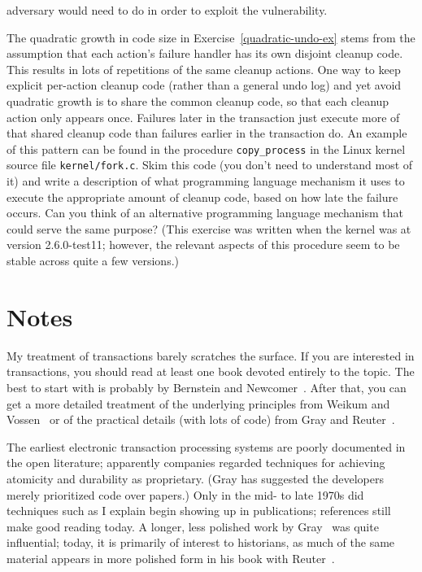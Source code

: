 \begin{chapterEnumerate}
adversary would need to do in order to exploit the vulnerability.
\item
\label{kernel-failure-atomicity-exercise}
The quadratic growth in code size in Exercise~\ref{quadratic-undo-ex} stems
from the assumption that each action's failure handler has its own disjoint
cleanup code.  This results in lots of repetitions of the same cleanup
actions.  One way to keep explicit per-action cleanup code (rather than a
general undo log) and yet avoid quadratic growth is to share the common
cleanup code, so that each cleanup action only appears once.  Failures later
in the transaction just execute more of that shared cleanup code than
failures earlier in the transaction do. An example of this pattern can
be found in the procedure \verb|copy_process| in the Linux kernel
source file \verb|kernel/fork.c|.  Skim this code (you don't need to
understand most of it) and write a description of what
programming language mechanism it uses to execute the appropriate
amount of cleanup code, based on how late the failure occurs.  Can you
think of an alternative programming language mechanism that could
serve the same purpose?  (This exercise was written when the kernel
was at version 2.6.0-test11; however, the relevant aspects of this
procedure seem to be stable across quite a few versions.)
\end{chapterEnumerate}

\section*{Notes}

My treatment of transactions barely scratches the surface.
If you are interested in transactions, you should read at
least one book devoted entirely to the topic.  The best to start with
is probably by Bernstein and
Newcomer~\cite{max1054}.  After that, you can
get a more detailed treatment of the underlying principles from
Weikum and Vossen~\cite{max1085}
or of the practical details (with lots of code) from 
Gray and Reuter~\cite{max1009}.

The earliest electronic transaction processing systems are poorly
documented in the open literature; apparently companies regarded
techniques for achieving atomicity and durability as proprietary.
(Gray has suggested the developers merely prioritized code over
papers.)  Only in the mid- to late 1970s did techniques such as I
explain begin showing up in publications;
references \cite{max1005,max1007,max1050,max1004} still make good reading today.  A
longer, less polished work by Gray~\cite{max1056} was quite
influential; today, it is primarily of interest to historians, as much
of the same material appears in more polished form in his book with Reuter~\cite{max1009}.

